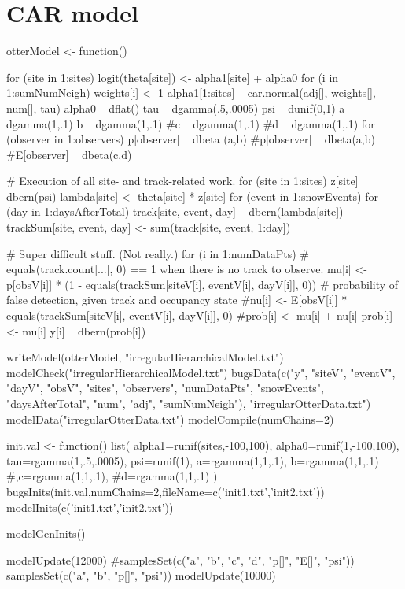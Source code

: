 \documentclass[12pt]{article}
\begin{document}
\section{CAR model}
\scriptsize
\begin{verbatimtab}
otterModel <- function() {
    for (site in 1:sites) {
        logit(theta[site]) <- alpha1[site] + alpha0
    }
    for (i in 1:sumNumNeigh) {
        weights[i] <- 1
    }
    alpha1[1:sites] ~ car.normal(adj[], weights[], num[], tau)
    alpha0 ~ dflat()
    tau ~ dgamma(.5,.0005)
    psi ~ dunif(0,1) 
    a ~ dgamma(1,.1)
    b ~ dgamma(1,.1)
    #c ~ dgamma(1,.1)
    #d ~ dgamma(1,.1)
    for (observer in 1:observers) {
        p[observer] ~ dbeta (a,b)
	  #p[observer] ~ dbeta(a,b) %
        #E[observer] ~ dbeta(c,d) %
    }

    # Execution of all site- and track-related work.
    for (site in 1:sites) {
        z[site] ~ dbern(psi)
        lambda[site] <- theta[site] * z[site]
        for (event in 1:snowEvents) {
            for (day in 1:daysAfterTotal) {
                track[site, event, day] ~ dbern(lambda[site])
                trackSum[site, event, day] <- sum(track[site, event, 1:day])
            }
        }
    }

    # Super difficult stuff.  (Not really.)
    for (i in 1:numDataPts) {
        # equals(track.count[...], 0) == 1 when there is no track to observe.
        mu[i] <- 
            p[obsV[i]] * (1 - equals(trackSum[siteV[i], eventV[i], dayV[i]], 0))
        # probability of false detection, given track and occupancy state
        #nu[i] <- E[obsV[i]] * equals(trackSum[siteV[i], eventV[i], dayV[i]], 0)
        #prob[i] <- mu[i] + nu[i]
        prob[i] <- mu[i]
	  y[i] ~ dbern(prob[i])
    }
}

writeModel(otterModel, "irregularHierarchicalModel.txt")
modelCheck("irregularHierarchicalModel.txt")
bugsData(c("y", "siteV", "eventV", "dayV", "obsV", "sites", "observers",
           "numDataPts", "snowEvents", "daysAfterTotal", "num", "adj",
           "sumNumNeigh"), 
         "irregularOtterData.txt")
modelData("irregularOtterData.txt")
modelCompile(numChains=2)

init.val <- function(){
	list(
		alpha1=runif(sites,-100,100),
		alpha0=runif(1,-100,100),
		tau=rgamma(1,.5,.0005),
		psi=runif(1),
		a=rgamma(1,1,.1),
		b=rgamma(1,1,.1)
		#,c=rgamma(1,1,.1),
		#d=rgamma(1,1,.1)
	) 
}
bugsInits(init.val,numChains=2,fileName=c('init1.txt','init2.txt'))
modelInits(c('init1.txt','init2.txt'))

modelGenInits()

modelUpdate(12000)
#samplesSet(c("a", "b", "c", "d", "p[]", "E[]", "psi"))
samplesSet(c("a", "b", "p[]", "psi"))
modelUpdate(10000)
\end{verbatimtab}
\end{document}
